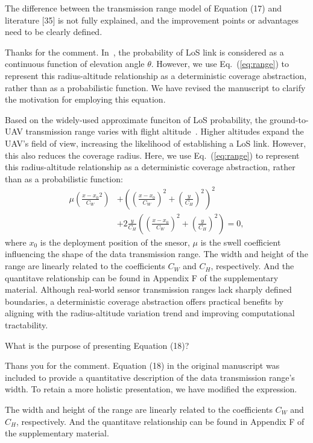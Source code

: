 \begin{revcomment}
	The difference between the transmission range model of Equation (17) and literature [35] is not fully explained, and the improvement points or advantages need to be clearly defined.
\end{revcomment}
\begin{revresponse}
	Thanks for the comment.
	In~\cite{LAP}, the probability of LoS link is considered as a continuous function of elevation angle $\theta$.
	However, we use Eq.~(\ref{eq:range}) to represent this radius-altitude relationship as a deterministic coverage abstraction, rather than as a probabilistic function.
	We have revised the manuscript to clarify the motivation for employing this equation.
	\begin{changes}
		Based on the widely-used approximate funciton of LoS probability, the ground-to-UAV transmission range varies with flight altitude~\cite{LAP}.
		Higher altitudes expand the UAV's field of view, increasing the likelihood of establishing a LoS link.
		However, this also reduces the coverage radius.
		Here, we use Eq.~(\ref{eq:range}) to represent this radius-altitude relationship as a deterministic coverage abstraction, rather than as a probabilistic function:
		\begin{equation}
		\begin{split}
		\mu (\frac{x-x_0}{C_W}^2) & + ((\frac{x-x_0}{C_W})^2 + (\frac{y}{C_H})^2)^2 \\
		& + 2\frac{y}{C_H}((\frac{x-x_0}{C_W})^2 + (\frac{y}{C_H})^2) = 0,
		\end{split}
		\label{eq:range}
		\end{equation}
		where $x_0$ is the deployment position of the snesor, $\mu$ is the swell coefficient influencing the shape of the data transmission range.
		The width and height of the range are linearly related to the coefficients $C_W$ and $C_H$, respectively. And the quantitave relationship can be found in Appendix F of the supplementary material.
		Although real-world sensor transmission ranges lack sharply defined boundaries, a deterministic coverage abstraction offers practical benefits by aligning with the radius-altitude variation trend and improving computational tractability.
	\end{changes}
\end{revresponse}

\begin{revcomment}
	What is the purpose of presenting Equation (18)?
\end{revcomment}
\begin{revresponse}
	Thans you for the comment.
	Equation (18) in the original manuscript was included to provide a quantitative description of the data transmission range's width.
	To retain a more holistic presentation, we have modified the expression.
	\begin{changes}
		The width and height of the range are linearly related to the coefficients $C_W$ and $C_H$, respectively.
		And the quantitave relationship can be found in Appendix F of the supplementary material.
	\end{changes}
\end{revresponse}

